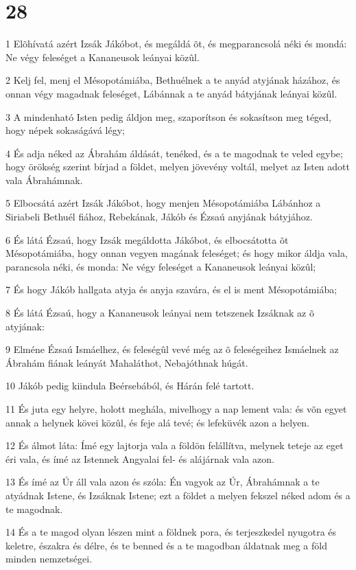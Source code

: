 \chapter{28}

\par 1 Elõhívatá azért Izsák Jákóbot, és megáldá õt, és megparancsolá néki és mondá: Ne végy feleséget a Kananeusok leányai közûl.
\par 2 Kelj fel, menj el Mésopotámiába, Bethuélnek a te anyád atyjának házához, és onnan végy magadnak feleséget, Lábánnak a te anyád bátyjának leányai közûl.
\par 3 A mindenható Isten pedig áldjon meg, szaporítson és sokasítson meg téged, hogy népek sokaságává légy;
\par 4 És adja néked az Ábrahám áldását, tenéked, és a te magodnak te veled egybe; hogy örökség szerint bírjad a földet, melyen jövevény voltál, melyet az Isten adott vala Ábrahámnak.
\par 5 Elbocsátá azért Izsák Jákóbot, hogy menjen Mésopotámiába Lábánhoz a Siriabeli Bethuél fiához, Rebekának, Jákób és Ézsaú anyjának bátyjához.
\par 6 És látá Ézsaú, hogy Izsák megáldotta Jákóbot, és elbocsátotta õt Mésopotámiába, hogy onnan vegyen magának feleséget; és hogy mikor áldja vala, parancsola néki, és monda: Ne végy feleséget a Kananeusok leányai közûl;
\par 7 És hogy Jákób hallgata atyja és anyja szavára, és el is ment Mésopotámiába;
\par 8 És látá Ézsaú, hogy a Kananeusok leányai nem tetszenek Izsáknak az õ atyjának:
\par 9 Elméne Ézsaú Ismáelhez, és feleségûl vevé még az õ feleségeihez Ismáelnek az Ábrahám fiának leányát Mahaláthot, Nebajóthnak húgát.
\par 10 Jákób pedig kiindula Beérsebából, és Hárán felé tartott.
\par 11 És juta egy helyre, holott meghála, mivelhogy a nap lement vala: és võn egyet annak a helynek kövei közûl, és feje alá tevé; és lefeküvék azon a helyen.
\par 12 És álmot láta: Ímé egy lajtorja vala a földön felállítva, melynek teteje az eget éri vala, és ímé az Istennek Angyalai fel- és alájárnak vala azon.
\par 13 És ímé az Úr áll vala azon és szóla: Én vagyok az Úr, Ábrahámnak a te atyádnak Istene, és Izsáknak Istene; ezt a földet a melyen fekszel néked adom és a te magodnak.
\par 14 És a te magod olyan lészen mint a földnek pora, és terjeszkedel nyugotra és keletre, északra és délre, és te  benned és a te magodban áldatnak meg a föld minden nemzetségei.
